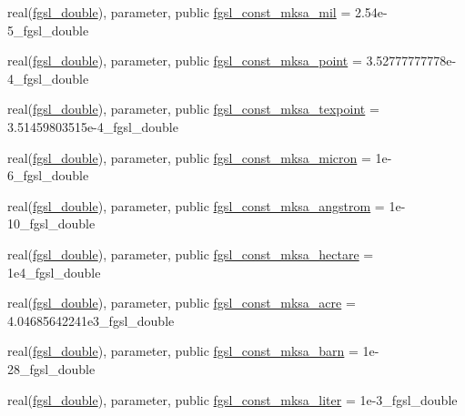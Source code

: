 \begin{DoxyCompactItemize}
\item 
real(\hyperlink{namespacefgsl_a9af5113378e0f000eb479d3f90196ddf}{fgsl\+\_\+double}), parameter, public \hyperlink{namespacefgsl_af6a9d8baf161c3f9b2b9c8ef41833a67}{fgsl\+\_\+const\+\_\+mksa\+\_\+mil} = 2.\+54e-\/5\+\_\+fgsl\+\_\+double
\item 
real(\hyperlink{namespacefgsl_a9af5113378e0f000eb479d3f90196ddf}{fgsl\+\_\+double}), parameter, public \hyperlink{namespacefgsl_ad8f1c0644b869b25114ce66526bd4a9d}{fgsl\+\_\+const\+\_\+mksa\+\_\+point} = 3.\+52777777778e-\/4\+\_\+fgsl\+\_\+double
\item 
real(\hyperlink{namespacefgsl_a9af5113378e0f000eb479d3f90196ddf}{fgsl\+\_\+double}), parameter, public \hyperlink{namespacefgsl_a962d8da1f8bc62c2323777660898e316}{fgsl\+\_\+const\+\_\+mksa\+\_\+texpoint} = 3.\+51459803515e-\/4\+\_\+fgsl\+\_\+double
\item 
real(\hyperlink{namespacefgsl_a9af5113378e0f000eb479d3f90196ddf}{fgsl\+\_\+double}), parameter, public \hyperlink{namespacefgsl_ab0be2229dca10e5128f21a8729ff742b}{fgsl\+\_\+const\+\_\+mksa\+\_\+micron} = 1e-\/6\+\_\+fgsl\+\_\+double
\item 
real(\hyperlink{namespacefgsl_a9af5113378e0f000eb479d3f90196ddf}{fgsl\+\_\+double}), parameter, public \hyperlink{namespacefgsl_ae348f6545928612e5e56ed4174d31875}{fgsl\+\_\+const\+\_\+mksa\+\_\+angstrom} = 1e-\/10\+\_\+fgsl\+\_\+double
\item 
real(\hyperlink{namespacefgsl_a9af5113378e0f000eb479d3f90196ddf}{fgsl\+\_\+double}), parameter, public \hyperlink{namespacefgsl_a62efb1288447e01349bbf38c21b82e70}{fgsl\+\_\+const\+\_\+mksa\+\_\+hectare} = 1e4\+\_\+fgsl\+\_\+double
\item 
real(\hyperlink{namespacefgsl_a9af5113378e0f000eb479d3f90196ddf}{fgsl\+\_\+double}), parameter, public \hyperlink{namespacefgsl_a58e85d8e8be547abd415a03ac8cfe6d9}{fgsl\+\_\+const\+\_\+mksa\+\_\+acre} = 4.\+04685642241e3\+\_\+fgsl\+\_\+double
\item 
real(\hyperlink{namespacefgsl_a9af5113378e0f000eb479d3f90196ddf}{fgsl\+\_\+double}), parameter, public \hyperlink{namespacefgsl_a859c8ea83a5175d31bc4240282c2b0b4}{fgsl\+\_\+const\+\_\+mksa\+\_\+barn} = 1e-\/28\+\_\+fgsl\+\_\+double
\item 
real(\hyperlink{namespacefgsl_a9af5113378e0f000eb479d3f90196ddf}{fgsl\+\_\+double}), parameter, public \hyperlink{namespacefgsl_ac989bb9124679e7e571cef06c81e5fe3}{fgsl\+\_\+const\+\_\+mksa\+\_\+liter} = 1e-\/3\+\_\+fgsl\+\_\+double
\item 

\end{DoxyCompactItemize}
